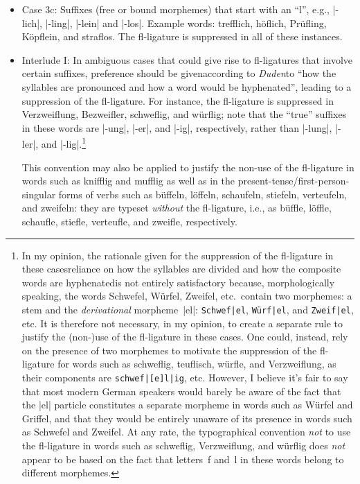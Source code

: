 \documentclass[11pt]{article}
\begin{document}
\begin{itemize}
\begin{itemize}
\item Case 3c: Suffixes (free or bound morphemes) that start with an \enquote{l}, e.g., |-lich|, |-ling|, |-lein| and |-los|. Example words: trefflich, höflich, Prüfling, Köpflein, and s\breaklig traflos. The fl-ligature is suppressed in all of these instances. 

\item Interlude I: In ambiguous cases that could give rise to fl-ligatures that involve certain suffixes, preference should be given\textemdash according to  \emph{Duden}\textemdash to \enquote{how the syllables are pronounced and how a word would be hyphenated}, leading to a suppression of the fl-ligature. For instance, the fl-ligature is suppressed in Verzweif\-lung, Bezweifler, schweflig, and würflig; note that the \enquote{true} suffixes in these words are |-ung|, |-er|, and |-ig|, respectively, rather than |-lung|, |-ler|, and |-lig|.\footnote{%
In my opinion, the rationale given for the suppression of the fl-ligature in these cases\textemdash reliance on how the syllables are divided and how the composite words are hyphenated\textemdash is not entirely satisfactory because, morphologically speaking, the words Schwefel, Würfel, Zweifel, etc.\ contain two morphemes: a stem and the \emph{derivational} morpheme~|el|: \Verb+Schwef|el+, \Verb+Würf|el+, and \Verb+Zweif|el+, etc. It is therefore not necessary, in my opinion, to create a separate rule to justify the (non-)use of the fl-ligature in these cases. One could, instead, rely on the presence of two morphemes to motivate the suppression of the fl-ligature for words such as schweflig, teuflisch, würfle, and Verzweiflung, as their components are \Verb+schwef|[e]l|ig+, etc. However, I believe it's fair to say that most modern German speakers would barely be aware of the fact that the |el| particle constitutes a separate morpheme in words such as Würfel and Griffel, and that they would be entirely unaware of its presence in words such as Schwefel and Zweifel. At any rate, the typographical convention \emph{not} to use the fl-ligature in words such as schweflig, Verzweiflung, and würflig does \emph{not} appear to be based on the fact that letters~f and~l in these words belong to different morphemes.}

This convention may also be applied to justify the non-use of the fl-ligature in words such as knifflig and mufflig as well as in the present-tense/first-person-singular forms of verbs such as büffeln, löffeln, schaufeln, stiefeln, verteufeln, and zweifeln: they are typeset \emph{without} the fl-ligature, i.e., as büffle, löffle, schaufle, stiefle, verteufle, and zweifle, respectively.


\end{itemize}
\end{itemize}
\end{document}

